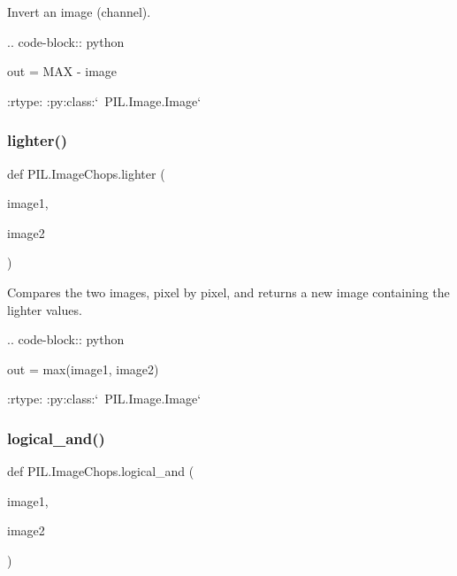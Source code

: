 \begin{DoxyVerb}Invert an image (channel).

.. code-block:: python

    out = MAX - image

:rtype: :py:class:`~PIL.Image.Image`
\end{DoxyVerb}
 \mbox{\label{namespacePIL_1_1ImageChops_a0e6eb49139eb74e7f63daec6838434d6}} 
\subsubsection{\texorpdfstring{lighter()}{lighter()}}
{\footnotesize\ttfamily def P\+I\+L.\+Image\+Chops.\+lighter (\begin{DoxyParamCaption}\item[{}]{image1,  }\item[{}]{image2 }\end{DoxyParamCaption})}

\begin{DoxyVerb}Compares the two images, pixel by pixel, and returns a new image containing
the lighter values.

.. code-block:: python

    out = max(image1, image2)

:rtype: :py:class:`~PIL.Image.Image`
\end{DoxyVerb}
 \mbox{\label{namespacePIL_1_1ImageChops_a54a0fe618f3d418f4bf71deadd5e0b39}} 
\subsubsection{\texorpdfstring{logical\+\_\+and()}{logical\_and()}}
{\footnotesize\ttfamily def P\+I\+L.\+Image\+Chops.\+logical\+\_\+and (\begin{DoxyParamCaption}\item[{}]{image1,  }\item[{}]{image2 }\end{DoxyParamCaption})}

